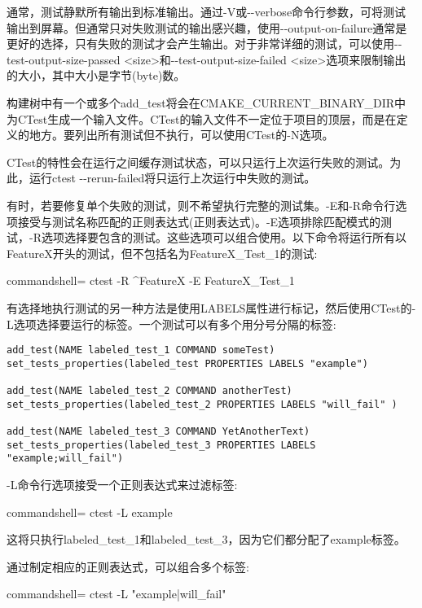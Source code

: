 通常，测试静默所有输出到标准输出。通过-V或-{}-verbose命令行参数，可将测试输出到屏幕。但通常只对失败测试的输出感兴趣，使用-{}-output-on-failure通常是更好的选择，只有失败的测试才会产生输出。对于非常详细的测试，可以使用-{}-test-output-size-passed <size>和-{}-test-output-size-failed <size>选项来限制输出的大小，其中大小是字节(byte)数。

构建树中有一个或多个add\_test将会在CMAKE\_CURRENT\_BINARY\_DIR中为CTest生成一个输入文件。CTest的输入文件不一定位于项目的顶层，而是在定义的地方。要列出所有测试但不执行，可以使用CTest的-N选项。

CTest的特性会在运行之间缓存测试状态，可以只运行上次运行失败的测试。为此，运行ctest -{}-rerun-failed将只运行上次运行中失败的测试。

有时，若要修复单个失败的测试，则不希望执行完整的测试集。-E和-R命令行选项接受与测试名称匹配的正则表达式(正则表达式)。-E选项排除匹配模式的测试，-R选项选择要包含的测试。这些选项可以组合使用。以下命令将运行所有以FeatureX开头的测试，但不包括名为FeatureX\_Test\_1的测试:

\begin{tcblisting}{commandshell={}}
ctest -R ^FeatureX -E FeatureX_Test_1
\end{tcblisting}

有选择地执行测试的另一种方法是使用LABELS属性进行标记，然后使用CTest的-L选项选择要运行的标签。一个测试可以有多个用分号分隔的标签:

\begin{lstlisting}[style=styleCMake]
add_test(NAME labeled_test_1 COMMAND someTest)
set_tests_properties(labeled_test PROPERTIES LABELS "example")

add_test(NAME labeled_test_2 COMMAND anotherTest)
set_tests_properties(labeled_test_2 PROPERTIES LABELS "will_fail" )

add_test(NAME labeled_test_3 COMMAND YetAnotherText)
set_tests_properties(labeled_test_3 PROPERTIES LABELS "example;will_fail")
\end{lstlisting}

-L命令行选项接受一个正则表达式来过滤标签:

\begin{tcblisting}{commandshell={}}
ctest -L example
\end{tcblisting}

这将只执行labeled\_test\_1和labeled\_test\_3，因为它们都分配了example标签。

通过制定相应的正则表达式，可以组合多个标签:

\begin{tcblisting}{commandshell={}}
ctest -L "example|will_fail"
\end{tcblisting}

